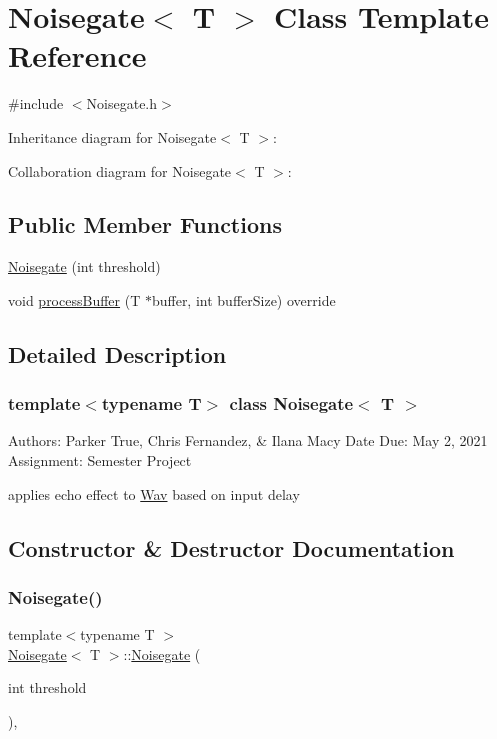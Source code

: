 \hypertarget{classNoisegate}{}\section{Noisegate$<$ T $>$ Class Template Reference}
\label{classNoisegate}


{\ttfamily \#include $<$Noisegate.\+h$>$}



Inheritance diagram for Noisegate$<$ T $>$\+:


Collaboration diagram for Noisegate$<$ T $>$\+:
\subsection*{Public Member Functions}
\begin{DoxyCompactItemize}
\item 
\hyperlink{classNoisegate_a267d2fcf1167db41c925983401af2e6f}{Noisegate} (int threshold)
\item 
void \hyperlink{classNoisegate_a4ab84c99ea64beb3015134756a358eb9}{process\+Buffer} (T $\ast$buffer, int buffer\+Size) override
\end{DoxyCompactItemize}


\subsection{Detailed Description}
\subsubsection*{template$<$typename T$>$\newline
class Noisegate$<$ T $>$}

Authors\+: Parker True, Chris Fernandez, \& Ilana Macy Date Due\+: May 2, 2021 Assignment\+: Semester Project

applies echo effect to \hyperlink{classWav}{Wav} based on input delay 

\subsection{Constructor \& Destructor Documentation}
\mbox{\label{classNoisegate_a267d2fcf1167db41c925983401af2e6f}} 
\subsubsection{\texorpdfstring{Noisegate()}{Noisegate()}}
{\footnotesize\ttfamily template$<$typename T $>$ \\
\hyperlink{classNoisegate}{Noisegate}$<$ T $>$\+::\hyperlink{classNoisegate}{Noisegate} (\begin{DoxyParamCaption}\item[{int}]{threshold }\end{DoxyParamCaption})\hspace{0.3cm}{\ttfamily [inline]}, {\ttfamily [explicit]}}


